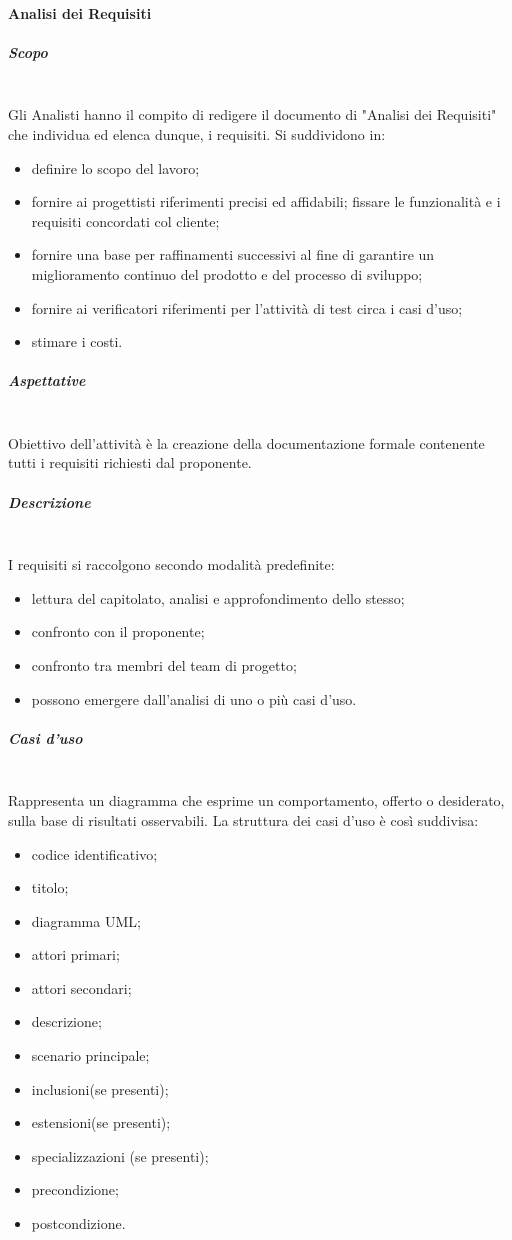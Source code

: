 \paragraph{Analisi dei Requisiti}
\subparagraph{Scopo} \mbox{}\\
Gli Analisti hanno il compito di redigere il documento di
"Analisi dei Requisiti" che individua ed elenca dunque, i requisiti.
Si suddividono in:
\begin{itemize}
	\item definire lo scopo del lavoro;
	\item fornire ai progettisti riferimenti precisi ed affidabili;
	fissare le funzionalità e i requisiti concordati col cliente;
	\item fornire  una  base  per  raffinamenti  successivi  al  fine  di  garantire  un miglioramento continuo del prodotto e del processo di sviluppo;
	\item fornire ai verificatori riferimenti per l'attività di test circa i casi d'uso;
	\item stimare i costi.
\end{itemize}
\subparagraph{Aspettative} \mbox{}\\
Obiettivo dell'attività è la creazione della documentazione formale contenente tutti i
requisiti richiesti dal proponente.
\subparagraph{Descrizione} \mbox{}\\
I requisiti si raccolgono secondo modalità predefinite:
\begin{itemize}
	\item lettura del capitolato, analisi e approfondimento dello stesso;
	\item confronto con il proponente;
	\item confronto tra membri del team di progetto;
	\item possono emergere dall'analisi di uno o più casi d'uso.
\end{itemize}
\subparagraph{Casi d'uso} \mbox{}\\
Rappresenta un diagramma che esprime un comportamento,
offerto o desiderato, sulla base di risultati osservabili.
La struttura dei casi d'uso è così suddivisa:
\begin{itemize}
	\item codice identificativo;
	\item titolo;
	\item diagramma UML;
	\item attori primari;
	\item attori secondari;
	\item descrizione;
	\item scenario principale;
	\item inclusioni(se presenti);
	\item estensioni(se presenti);
	\item specializzazioni (se presenti);
	\item precondizione;
	\item postcondizione.
\end{itemize}
